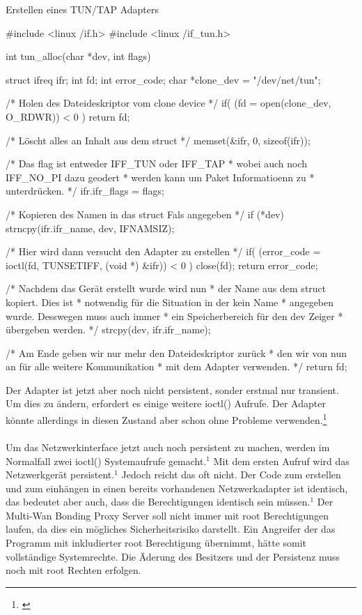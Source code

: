 \begin{program}[H]
    \caption{Erstellen eines TUN/TAP Adapters}
    \label{IDK2}
    \begin{CppCode}
#include <linux /if.h>
#include <linux /if_tun.h>

int tun_alloc(char *dev, int flags) {
    struct ifreq ifr;
    int fd;
    int error_code;
    char *clone_dev = "/dev/net/tun";

    /* Holen des Dateideskriptor vom clone device */
    if( (fd = open(clone_dev, O_RDWR)) < 0 ) {
        return fd;
    }

    /* Löscht alles an Inhalt aus dem struct */
    memset(&ifr, 0, sizeof(ifr));

    /* Das flag ist entweder IFF_TUN oder IFF_TAP
    * wobei auch noch IFF_NO_PI dazu geodert 
    * werden kann um Paket Informatioenn zu 
    * unterdrücken.
    */
    ifr.ifr_flags = flags;   

    /* Kopieren des Namen in das struct Fals angegeben */
    if (*dev) {
        strncpy(ifr.ifr_name, dev, IFNAMSIZ);
    }

    /* Hier wird dann versucht den Adapter zu erstellen */
    if( (error_code = ioctl(fd, TUNSETIFF, (void *) &ifr)) < 0 ) {
        close(fd);
        return error_code;
    }

    /* Nachdem das Gerät erstellt wurde wird nun
    * der Name aus dem struct kopiert. Dies ist 
    * notwendig für die Situation in der kein Name
    * angegeben wurde. Desswegen muss auch immer 
    * ein Speicherbereich für den dev Zeiger 
    * übergeben werden.
    */
    strcpy(dev, ifr.ifr_name);

    /* Am Ende geben wir nur mehr den Dateideskriptor zurück 
    * den wir von nun an für alle weitere Kommunikation
    * mit dem Adapter verwenden.
    */
    return fd;
}
    \end{CppCode}
\end{program}
\newpage
\noindent
Der Adapter ist jetzt aber noch nicht persistent, sonder erstmal nur transient. Um dies zu ändern, erfordert es einige weitere ioctl() Aufrufe.  Der Adapter könnte allerdings in diesen Zustand aber schon ohne Probleme verwenden.\footnote[1]{\cite[Vgl.][]{TUNTAP}}
\\\\
Um das Netzwerkinterface jetzt auch noch persistent zu machen, werden im Normalfall zwei ioctl() Systemaufrufe gemacht.$^{1}$ Mit dem ersten Aufruf wird das Netzwerkgerät persistent.$^{1}$ Jedoch reicht das oft nicht. Der Code zum erstellen und zum einhängen in einen bereits vorhandenen Netzwerkadapter ist identisch, das bedeutet aber auch, dass die Berechtigungen identisch sein müssen.$^{1}$ Der Multi-Wan Bonding Proxy Server soll nicht immer mit root Berechtigungen laufen, da dies ein mögliches Sicherheitsrisiko darstellt. Ein Angreifer der das Programm mit inkludierter root Berechtigung übernimmt, hätte somit vollständige Systemrechte. Die Äderung des Besitzers und der Persistenz muss noch mit root Rechten erfolgen.
